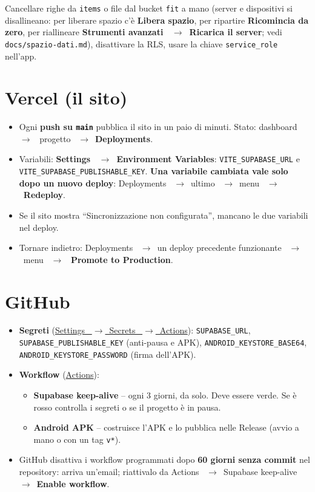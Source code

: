 \documentclass[11pt,a4paper]{article}
\newcommand{\ra}{\unskip\nobreak\ $\rightarrow$\ \ignorespaces}            %
\newcommand{\bt}[1]{\textbf{#1}}               %
\newcommand{\code}[1]{\texttt{#1}}             %
\newcommand{\repo}{https://github.com/AleCovi04/My-Masterpiece}
\begin{document}
\begin{attenzione}
Cancellare righe da \code{items} o file dal bucket \code{fit} a mano (server e dispositivi si
disallineano: per liberare spazio c'è \bt{Libera spazio}, per ripartire \bt{Ricomincia da zero},
per riallineare \bt{Strumenti avanzati \ra Ricarica il server}; vedi \code{docs/spazio-dati.md}),
disattivare la RLS, usare la chiave \code{service\_role} nell'app.
\end{attenzione}

\section{Vercel (il sito)}\label{sec:vercel}

\begin{itemize}
  \item Ogni \bt{push su \code{main}} pubblica il sito in un paio di minuti. Stato: dashboard \ra
    progetto \ra \bt{Deployments}.
  \item Variabili: \bt{Settings \ra Environment Variables}: \code{VITE\_SUPABASE\_URL} e
    \code{VITE\_SUPABASE\_\allowbreak PUBLISHABLE\_KEY}. \bt{Una variabile cambiata vale solo dopo un nuovo
    deploy}: Deployments \ra ultimo \ra menu \ra \bt{Redeploy}.
  \item Se il sito mostra ``Sincronizzazione non configurata'', mancano le due variabili nel deploy.
  \item Tornare indietro: Deployments \ra un deploy precedente funzionante \ra menu \ra
    \bt{Promote to Production}.
\end{itemize}

\section{GitHub}\label{sec:github}

\begin{itemize}
  \item \bt{Segreti} (\href{\repo/settings/secrets/actions}{Settings \ra Secrets \ra Actions}):
    \code{SUPABASE\_URL}, \code{SUPABASE\_PUBLISHABLE\_KEY} (anti-pausa e APK),
    \code{ANDROID\_KEYSTORE\_BASE64}, \code{ANDROID\_KEYSTORE\_PASSWORD} (firma dell'APK).
  \item \bt{Workflow} (\href{\repo/actions}{Actions}):
    \begin{itemize}
      \item \bt{Supabase keep-alive} -- ogni 3 giorni, da solo. Deve essere verde. Se è rosso
        controlla i segreti o se il progetto è in pausa.
      \item \bt{Android APK} -- costruisce l'APK e lo pubblica nelle Release (avvio a mano o con
        un tag \code{v*}).
    \end{itemize}
  \item GitHub disattiva i workflow programmati dopo \bt{60 giorni senza commit} nel repository:
    arriva un'email; riattivalo da Actions \ra Supabase keep-alive \ra \bt{Enable workflow}.
\end{itemize}
\end{document}
